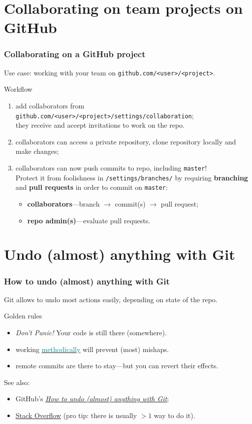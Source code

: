 \documentclass[10pt,svgnames,handout]{beamer}
\begin{document}
\section{Collaborating on team projects on GitHub}
\begin{frame}
\frametitle{Collaborating on a GitHub project}
Use case: working with your team on \lstinline{github.com/<user>/<project>}.

\begin{block}{Workflow}
\begin{enumerate}[<+->]
  \item add collaborators from \lstinline{github.com/<user>/<project>/settings/collaboration};\\
  they receive and accept invitations to work on the repo.
  \item collaborators can access a private repository, clone repository locally and make changes;
  \item collaborators can now push commits to repo, including \lstinline{master}!\\Protect it from foolishness in \lstinline{/settings/branches/} by requiring \textbf{branching} and \textbf{pull requests} in order to commit on \lstinline{master}:
  \begin{itemize}
    \item \textbf{collaborators}—branch $\rightarrow$ commit(s) $\rightarrow$ pull request;
    \item \textbf{repo admin(s)}—evaluate pull requests.
  \end{itemize}
\end{enumerate}
\end{block}
\end{frame}


\section{Undo (almost) anything with Git}
\begin{frame}
\frametitle{How to undo (almost) anything with Git}

Git allows to undo most actions easily, depending on state of the repo.
\pause
\begin{block}{Golden rules}
\begin{itemize}
  \item \textit{Don't Panic!} Your code is still there (somewhere).
  \item working \hyperlink{style}{\textcolor{Teal}{methodically}} will prevent (most) mishaps.
  \item remote commits are there to stay—but you can revert their effects.
\end{itemize} 
\end{block}
\pause
See also:
\begin{itemize}
  \item GitHub's \href{https://github.com/blog/2019-how-to-undo-almost-anything-with-git}{\textit{How to undo (almost) anything with Git}};
  \item \href{https://stackoverflow.com/questions/tagged/git}{Stack Overflow} (pro tip: there is usually $>1$ way to do it).
\end{itemize}
\end{frame}
\end{document}
